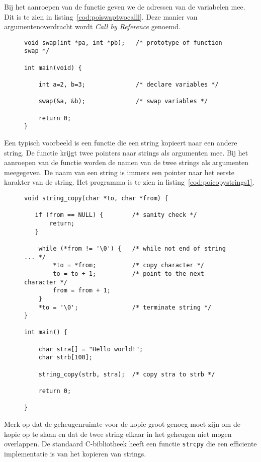 Bij het aanroepen van de functie geven we de adressen van de variabelen mee. Dit is te zien in listing~\ref{cod:poiswaptwocalll}. Deze manier van argumentenoverdracht wordt \textsl{Call by Reference} genoemd.

\begin{figure}[!ht]
\begin{lstlisting}[caption=Aanroep van de functie.,label=cod:poiswaptwocalll]
void swap(int *pa, int *pb);   /* prototype of function swap */

int main(void) {

    int a=2, b=3;              /* declare variables */

    swap(&a, &b);              /* swap variables */

    return 0;
}
\end{lstlisting}
\end{figure}

Een typisch voorbeeld is een functie die een string kopieert naar een andere string. De functie krijgt twee pointers naar strings als argumenten mee. Bij het aanroepen van de functie worden de namen van de twee strings als argumenten meegegeven. De naam van een string is immers een pointer naar het eerste karakter van de string. Het programma is te zien in listing~\ref{cod:poicopystrings1}.

\begin{figure}[!ht]
\begin{lstlisting}[caption=Functie voor het kopieren van een string.,label=cod:poicopystrings1]
void string_copy(char *to, char *from) {

   if (from == NULL) {        /* sanity check */
       return;
   }

    while (*from != '\0') {   /* while not end of string ... */
        *to = *from;          /* copy character */
        to = to + 1;          /* point to the next character */
        from = from + 1;
    }
    *to = '\0';               /* terminate string */
}

int main() {

    char stra[] = "Hello world!";
    char strb[100];

    string_copy(strb, stra);  /* copy stra to strb */

	return 0;

}
\end{lstlisting}
\end{figure}

Merk op dat de geheugenruimte voor de kopie groot genoeg moet zijn om de kopie op te slaan en dat de twee string elkaar in het geheugen niet mogen overlappen. De standaard C-bibliotheek heeft een functie \texttt{strcpy} die een efficiente implementatie is van het kopieren van strings.


